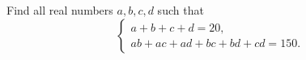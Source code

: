 Find all real numbers $ a,b,c,d$ such that \[ \left\{\begin{array}{cc}a + b + c + d = 20, \\

ab + ac + ad + bc + bd + cd = 150. \end{array} \right.\]